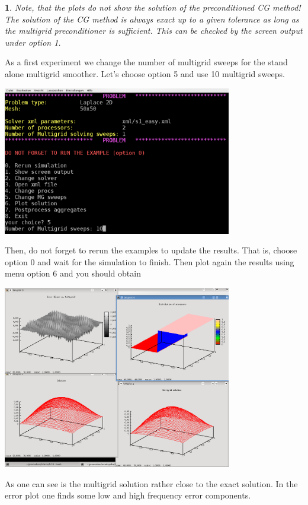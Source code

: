 \documentclass[10pt,fleqn]{book}
\newtheorem*{mycomment}{\ding{42}}
\begin{document}
\begin{mycomment}
Note, that the plots do not show the solution of the preconditioned CG method! The solution of the CG method is always exact up to a given tolerance as long as the multigrid preconditioner is sufficient. This can be checked by the screen output under option 1.
\end{mycomment}

As a first experiment we change the number of multigrid sweeps for the stand alone multigrid smoother. Let's choose option 5 and use 10 multigrid sweeps.
\begin{center}\includegraphics[width=10cm]{pics/tut1_7.png} \end{center}
Then, do not forget to rerun the examples to update the results. That is, choose option 0 and wait for the simulation to finish. Then plot again the results using menu option 6 and you should obtain
\begin{center}\includegraphics[width=10cm]{pics/tut1_8.png} \end{center}
As one can see is the multigrid solution rather close to the exact solution. In the error plot one finds some low and high frequency error components.
\end{document}
